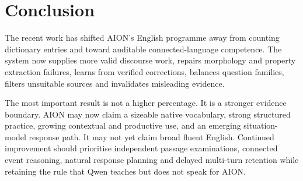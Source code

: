 \documentclass[11pt,a4paper]{article}
\begin{document}
\section{Conclusion}

The recent work has shifted AION's English programme away from counting dictionary entries and
toward auditable connected-language competence. The system now supplies more valid discourse
work, repairs morphology and property extraction failures, learns from verified corrections,
balances question families, filters unsuitable sources and invalidates misleading evidence.

The most important result is not a higher percentage. It is a stronger evidence boundary. AION
may now claim a sizeable native vocabulary, strong structured practice, growing contextual and
productive use, and an emerging situation-model response path. It may not yet claim broad fluent
English. Continued improvement should prioritise independent passage examinations, connected
event reasoning, natural response planning and delayed multi-turn retention while retaining the
rule that Qwen teaches but does not speak for AION.
\end{document}

